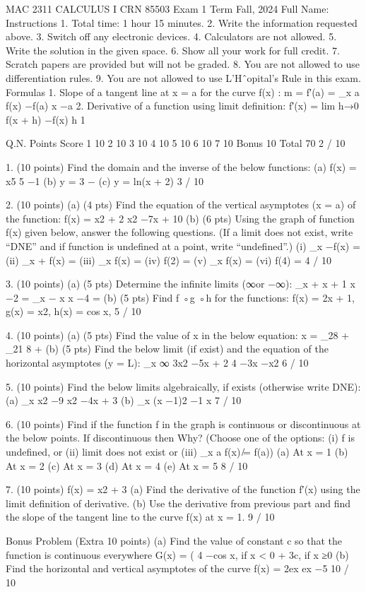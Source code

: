 MAC 2311 CALCULUS I CRN 85503
Exam 1
Term Fall, 2024
Full Name:
Instructions
1. Total time: 1 hour 15 minutes.
2. Write the information requested above.
3. Switch off any electronic devices.
4. Calculators are not allowed.
5. Write the solution in the given space.
6. Show all your work for full credit.
7. Scratch papers are provided but will not be graded.
8. You are not allowed to use differentiation rules.
9. You are not allowed to use L’Hˆopital’s Rule in this exam.
Formulas
1. Slope of a tangent line at x = a for the curve f(x) :
m = f′(a) = \lim_{{x \to a}}
f(x) −f(a)
x −a
2. Derivative of a function using limit definition: f′(x) = lim
h→0
f(x + h) −f(x)
h
1

Q.N.
Points
Score
1
10
2
10
3
10
4
10
5
10
6
10
7
10
Bonus
10
Total
70
2 / 10

1. (10 points) Find the domain and the inverse of the below functions:
(a) f(x) = x5
5 −1
(b) y = 3 −
(c) y = ln(x + 2)
3 / 10

2. (10 points)
(a) (4 pts) Find the equation of the vertical asymptotes (x = a) of the function: f(x) =
x2 + 2
x2 −7x + 10
(b) (6 pts) Using the graph of function f(x) given below, answer the following questions.
(If a limit does not exist, write “DNE” and if function is undefined at a point, write “undefined”.)
(i) \lim_{{x }}−f(x) =
(ii) \lim_{{x }}+ f(x) =
(iii) \lim_{{x }} f(x) =
(iv) f(2) =
(v) \lim_{{x }} f(x) =
(vi) f(4) =
4 / 10

3. (10 points)
(a) (5 pts) Determine the infinite limits (∞or −∞):
\lim_{{x }}+
x + 1
x −2 =
\lim_{{x }}−
x
x −4 =
(b) (5 pts) Find f ◦g ◦h for the functions: f(x) = 2x + 1,
g(x) = x2,
h(x) = cos x,
5 / 10

4. (10 points)
(a) (5 pts) Find the value of x in the below equation:
x = \log_{2}8 + \log_{2}1
8 + 
(b) (5 pts) Find the below limit (if exist) and the equation of the horizontal asymptotes (y = L):
\lim_{{x \to ∞}}
3x2 −5x + 2
4 −3x −x2
6 / 10

5. (10 points) Find the below limits algebraically, if exists (otherwise write DNE):
(a) \lim_{{x }}
x2 −9
x2 −4x + 3
(b) \lim_{{x }}
(x −1)2 −1
x
7 / 10

6. (10 points) Find if the function f in the graph is continuous or discontinuous at the below points.
If discontinuous then Why?
(Choose one of the options: (i) f is undefined, or (ii) limit does not exist or (iii) \lim_{{x \to a}} f(x) ̸= f(a))
(a) At x = 1
(b) At x = 2
(c) At x = 3
(d) At x = 4
(e) At x = 5
8 / 10

7. (10 points) f(x) = x2 + 3
(a) Find the derivative of the function f′(x) using the limit definition of derivative.
(b) Use the derivative from previous part and find the slope of the tangent line to the curve f(x) at x = 1.
9 / 10

Bonus Problem (Extra 10 points)
(a) Find the value of constant c so that the function is continuous everywhere
G(x) =
(
4 −cos x,
if x < 0
 + 3c,
if x ≥0
(b) Find the horizontal and vertical asymptotes of the curve
f(x) =
2ex
ex −5
10 / 10

